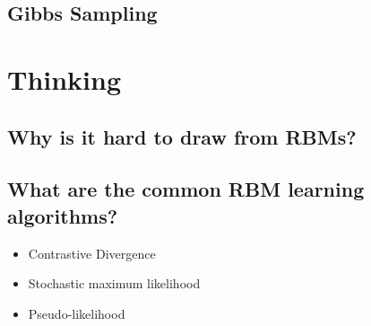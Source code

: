 \documentclass[11pt]{article}
\begin{document}
\subsection{Gibbs Sampling}
\label{sec:org64e80ce}



\section{Thinking}
\label{sec:org1b5f31b}
\subsection{Why is it hard to draw from RBMs?}
\label{sec:orgda5347e}
\subsection{What are the common RBM learning algorithms?}
\label{sec:org25c884e}
\begin{itemize}
\item Contrastive Divergence
\item Stochastic maximum likelihood
\item Pseudo-likelihood
\end{itemize}
\end{document}
